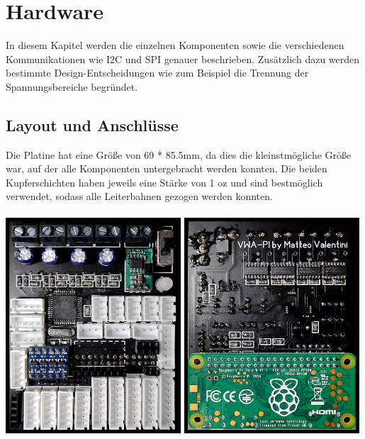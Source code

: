 \documentclass[12pt]{article}
\begin{document}
\newpage\section{Hardware}
In diesem Kapitel werden die einzelnen Komponenten sowie die verschiedenen Kommunikationen wie I2C und SPI genauer beschrieben. Zusätzlich dazu werden bestimmte Design-Entscheidungen wie zum Beispiel die Trennung der Spannungsbereiche begründet.
\subsection{Layout und Anschlüsse}
Die Platine hat eine Größe von 69 * 85.5mm, da dies die kleinstmögliche Größe war, auf der alle Komponenten untergebracht werden konnten. Die beiden Kupferschichten haben jeweils eine Stärke von 1 oz und sind bestmöglich verwendet, sodass alle Leiterbahnen gezogen werden konnten.\\\\
\includegraphics[width=0.49\textwidth]{img/vwa1.png}
\includegraphics[width=0.49\textwidth]{img/vwa2.png}
\end{document}
